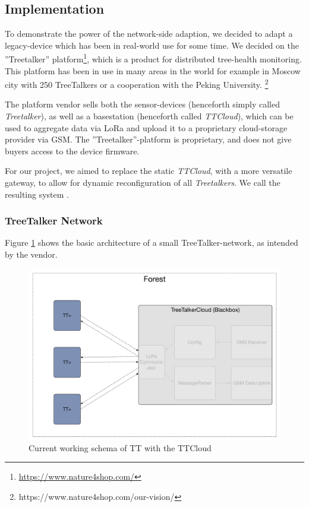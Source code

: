 \subsection{Implementation}

To demonstrate the power of the network-side adaption, we decided to adapt a legacy-device which has been in real-world use for some time.
We decided on the ''Treetalker'' platform\footnote{\url{https://www.nature4shop.com/}}, which is a product for distributed tree-health monitoring.
This platform has been in use in many areas in the world for example in Moscow city with 250 TreeTalkers or a cooperation with the Peking University. \footnote{https://www.nature4shop.com/our-vision/}

The platform vendor sells both the sensor-devices (henceforth simply called \textit{Treetalker}), as well as a basestation (henceforth called \textit{TTCloud}), which can be used to aggregate data via LoRa and upload it to a proprietary cloud-storage provider via GSM.
The ''Treetalker''-platform is proprietary, and does not give buyers access to the device firmware.

For our project, we aimed to replace the static \textit{TTCloud}, with a more versatile gateway, to allow for dynamic reconfiguration of all \textit{Treetalkers}.
We call the resulting system \ttt.


\subsubsection{TreeTalker Network}
\label{sec:implementation:treetalker:current}

Figure \ref{fig:tt-current} shows the basic architecture of a small TreeTalker-network, as intended by the vendor.

\begin{figure}
    \centering
    \includegraphics[width=.8\linewidth]{figures/TT_current.pdf}
    \caption{Current working schema of TT with the TTCloud}
    \label{fig:tt-current}
\end{figure}


